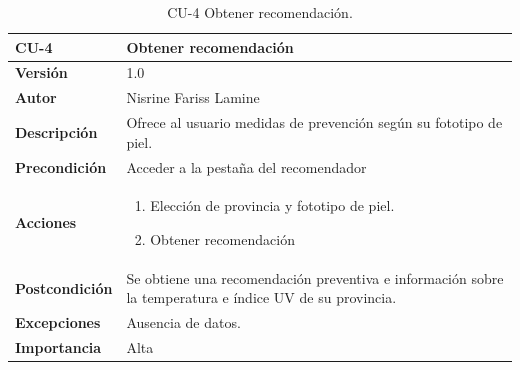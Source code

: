 \begin{table}[p]
	\centering
	\begin{tabularx}{\linewidth}{ p{} p{} }
		\toprule
		\textbf{CU-4}    & \textbf{Obtener recomendación}\\
		\toprule
		\textbf{Versión}              & 1.0    \\
		\textbf{Autor}                & Nisrine Fariss Lamine \\
		
		\textbf{Descripción}          & Ofrece al usuario medidas de prevención según su fototipo de piel. \\
		\textbf{Precondición}         & Acceder a la pestaña del recomendador \\
		\textbf{Acciones}             &
		\begin{enumerate}
			\def\labelenumi{\arabic{enumi}.}
			\tightlist
			\item Elección de provincia y fototipo de piel.
			\item Obtener recomendación
		\end{enumerate}\\
		\textbf{Postcondición}        & Se obtiene una recomendación preventiva e información sobre la temperatura e índice UV de su provincia. \\
		\textbf{Excepciones}          & Ausencia de datos. \\
		\textbf{Importancia}          & Alta \\
		\bottomrule
	\end{tabularx}
	\caption{CU-4 Obtener recomendación.}
\end{table}



